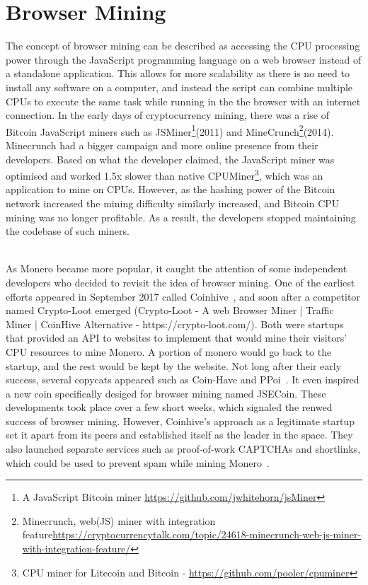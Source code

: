 

\section{Browser Mining}
The concept of browser mining can be described as accessing the CPU processing power through the JavaScript programming language on a web browser instead of a standalone application. This allows for more scalability as there is no need to install any software on a computer, and instead the script can combine multiple CPUs to execute the same task while running in the the browser with an internet connection. In the early days of cryptocurrency mining, there was a rise of Bitcoin JavaScript miners such as JSMiner\footnote{A JavaScript Bitcoin miner \url{https://github.com/jwhitehorn/jsMiner}}(2011) and MineCrunch\footnote{Minecrunch, web(JS) miner with integration feature\url{https://cryptocurrencytalk.com/topic/24618-minecrunch-web-js-miner-with-integration-feature/}}(2014). Minecrunch had a bigger campaign and more online presence from their developers. Based on what the developer claimed, the JavaScript miner was optimised and worked 1.5x slower than native CPUMiner\footnote{CPU miner for Litecoin and Bitcoin - \url{https://github.com/pooler/cpuminer}}, which was an application to mine on CPUs. However, as the hashing power of the Bitcoin network increased the mining difficulty similarly increased, and Bitcoin CPU mining was no longer profitable. As a result, the developers stopped maintaining the codebase of such miners.

\\
As Monero became more popular, it caught the attention of some independent developers who decided to revisit the idea of browser mining. One of the earliest efforts appeared in September 2017 called Coinhive~\cite{coinhive}, and soon after a competitor named Crypto-Loot emerged (Crypto-Loot - A web Browser Miner | Traffic Miner | CoinHive Alternative - https://crypto-loot.com/). Both were startups that provided an API to websites to implement that would mine their visitors' CPU resources to mine Monero. A portion of monero would go back to the startup, and the rest would be kept by the website. Not long after their early success, several copycats appeared such as Coin-Have and PPoi~\cite{coinhivecopycats}. It even inspired a new coin specifically desiged for browser mining named JSECoin. These developments took place over a few short weeks, which signaled the renwed success of browser mining. However, Coinhive's approach as a legitimate startup set it apart from its peers and established itself as the leader in the space. They also launched separate services such as proof-of-work CAPTCHAs and shortlinks, which could be used to prevent spam while mining Monero~\cite{coinhive}.

